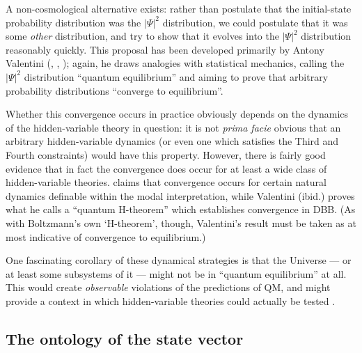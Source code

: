 \documentclass[12pt]{article}
\begin{document}
A non-cosmological alternative exists: rather than postulate that the initial-state probability distribution was the $|\Psi|^2$ distribution, we could postulate that it was some \emph{other} distribution, and try to show that it evolves into the $|\Psi|^2$ distribution reasonably quickly. This proposal has been developed primarily by Antony Valentini (, , ); again, he draws analogies with statistical mechanics, calling the $|\Psi|^2$ distribution ``quantum equilibrium'' and aiming to prove that arbitrary probability distributions ``converge to equilibrium''.

Whether this convergence occurs in practice obviously depends on the dynamics of the hidden-variable theory in question: it is not \emph{prima facie}  obvious that an arbitrary hidden-variable dynamics (or even one which satisfies the Third and Fourth constraints) would have this property. However, there is fairly good evidence that in fact the convergence does occur for at least a wide class of hidden-variable theories.  claims that convergence occurs for certain natural dynamics definable within the modal interpretation, while Valentini (ibid.) proves what he calls a ``quantum H-theorem''  which establishes convergence in DBB. (As with Boltzmann's own `H-theorem', though, Valentini's result must be taken as at most indicative of convergence to equilibrium.)

One fascinating corollary of these dynamical strategies is that the Universe --- or at least some subsystems of it --- might not be in ``quantum equilibrium'' at all. This would create \emph{observable} violations of the predictions of QM, and might provide a context in which hidden-variable theories could actually be tested \cite{valentini01,valentiniblackhole}.


\subsection{The ontology of the state vector}\label{DMWWhvontology}
\end{document}
